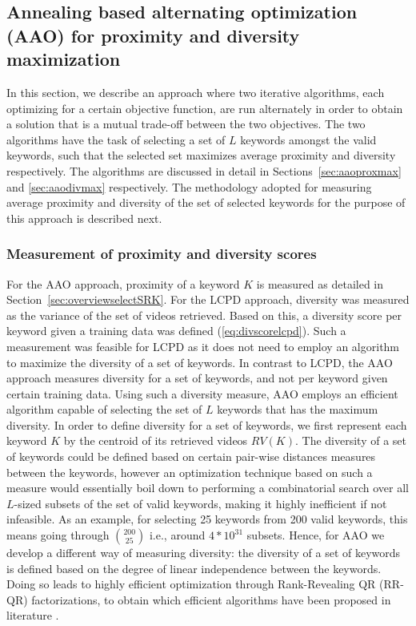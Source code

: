 \subsection{Annealing based alternating optimization (AAO) for proximity and diversity maximization}
\label{sec:aao}
In this section, we describe an approach where two iterative algorithms, each optimizing for a certain objective function, are run alternately in order to obtain a solution that is a mutual trade-off between the two objectives. The two algorithms have the task of selecting a set of $L$ keywords amongst the valid keywords, such that the selected set maximizes average proximity and diversity respectively. The algorithms are discussed in detail in Sections~\ref{sec:aaoproxmax} and \ref{sec:aaodivmax} respectively. The methodology adopted for measuring average proximity and diversity of the set of selected keywords for the purpose of this approach is described next.  

\subsubsection{Measurement of proximity and diversity scores}
\label{sec:proxdivmeasureAAO}

For the AAO approach, proximity of a keyword $K$ is measured as detailed in Section~\ref{sec:overviewselectSRK}. For the LCPD approach, diversity was measured as the variance of the set of videos retrieved. Based on this, a diversity score per keyword given a training data was defined (\ref{eq:divscorelcpd}). Such a measurement was feasible for LCPD as it does not need to employ an algorithm to maximize the diversity of a set of keywords. In contrast to LCPD, the AAO approach measures diversity for a set of keywords, and not per keyword given certain training data. Using such a diversity measure, AAO employs an efficient algorithm capable of selecting the set of $L$ keywords that has the maximum diversity. In order to define diversity for a set of keywords, we first represent each keyword $K$ by the centroid of its retrieved videos $RV(K)$. The diversity of a set of keywords could be defined based on certain pair-wise distances measures between the keywords, however an optimization technique based on such a measure would essentially boil down to performing a combinatorial search over all $L$-sized subsets of the set of valid keywords, making it highly inefficient if not infeasible. As an example, for selecting 25 keywords from 200 valid keywords, this means going through ${200 \choose 25}$ i.e., around $4*10^{31}$ subsets. Hence, for AAO we develop a different way of measuring diversity: the diversity of a set of keywords is defined based on the degree of linear independence between the keywords. Doing so leads to highly efficient optimization through Rank-Revealing QR (RR-QR) factorizations, to obtain which efficient algorithms have been proposed in literature \cite{BusingerLinear65,GolubNumeri65,ChanRank87,GuEfficient96}. 

